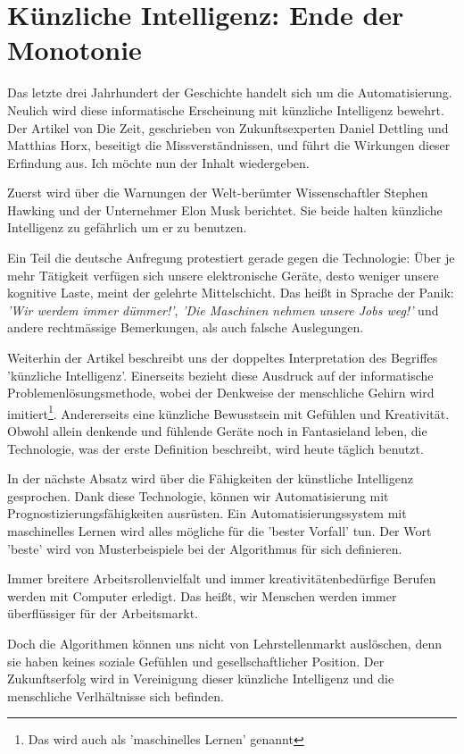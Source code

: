 \documentclass[../Mappe.tex]{subfiles}
\begin{document}
\section[Künzliche Intelligenz: Ende der Monotonie]{Künzliche Intelligenz: Ende der Monotonie \cite{zeitki}}

Das letzte drei Jahrhundert der Geschichte handelt sich um die Automatisierung.
Neulich wird diese informatische Erscheinung mit künzliche Intelligenz bewehrt.
Der Artikel von Die Zeit, geschrieben von Zukunftsexperten Daniel Dettling und Matthias Horx,
beseitigt die Missverständnissen,
und führt die Wirkungen dieser Erfindung aus.
Ich möchte nun der Inhalt wiedergeben.

Zuerst wird über die Warnungen der Welt-berümter Wissenschaftler Stephen Hawking und der Unternehmer Elon Musk berichtet.
Sie beide halten künzliche Intelligenz zu gefährlich um er zu benutzen.

Ein Teil die deutsche Aufregung protestiert gerade gegen die Technologie: 
Über je mehr Tätigkeit verfügen sich unsere elektronische Geräte, desto weniger unsere kognitive Laste, meint der gelehrte Mittelschicht.
Das heißt in Sprache der Panik: \emph{'Wir werdem immer dümmer!'}, \emph{'Die Maschinen nehmen unsere Jobs weg!'}
und andere rechtmässige Bemerkungen, als auch falsche Auslegungen.

Weiterhin der Artikel beschreibt uns der doppeltes Interpretation des Begriffes 'künzliche Intelligenz'.
Einerseits bezieht diese Ausdruck auf der informatische Problemenlösungsmethode, wobei der Denkweise der menschliche Gehirn wird imitiert\footnote{Das wird auch als 'maschinelles Lernen' genannt}.
Andererseits eine künzliche Bewusstsein mit Gefühlen und Kreativität.
Obwohl allein denkende und fühlende Geräte noch in Fantasieland leben, die Technologie, was der erste Definition beschreibt, wird heute täglich benutzt. 

In der nächste Absatz wird über die Fähigkeiten der künstliche Intelligenz gesprochen.
Dank diese Technologie, können wir Automatisierung mit Prognostizierungsfähigkeiten ausrüsten.
Ein Automatisierungssystem mit maschinelles Lernen wird alles mögliche für die 'bester Vorfall' tun.
Der Wort 'beste' wird von Musterbeispiele bei der Algorithmus für sich definieren.

Immer breitere Arbeitsrollenvielfalt und immer kreativitätenbedürfige Berufen werden mit Computer erledigt.
Das heißt, wir Menschen werden immer überflüssiger für der Arbeitsmarkt.

Doch die Algorithmen können uns nicht von Lehrstellenmarkt auslöschen, denn sie haben keines soziale Gefühlen und gesellschaftlicher Position.
Der Zukunftserfolg wird in Vereinigung dieser künzliche Intelligenz und die menschliche Verlhältnisse sich befinden.
\end{document}
